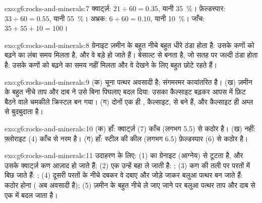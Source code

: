 \begin{solution}{exo:g6:rocks-and-minerals:7}
क्वार्ट्ज़: $21 \div 60 = 0.35$, यानी 35~\%। फ़ेल्डस्पार: $33 \div 60 = 0.55$,
यानी 55~\%। अभ्रक: $6 \div 60 = 0.10$, यानी 10~\%। जाँच:
$35 + 55 + 10 = 100$।
\end{solution}

\begin{solution}{exo:g6:rocks-and-minerals:8}
ग्रेनाइट ज़मीन के बहुत नीचे बहुत धीरे ठंडा होता है: उसके कणों को बढ़ने का लंबा समय
मिलता है, और वे बड़े हो जाते हैं। बेसाल्ट  से बनता है, जो सतह पर जल्दी ठंडा
होता है: उसके कणों को बढ़ने का समय नहीं मिलता और वे देखने के लिए बहुत छोटे रहते हैं।
\end{solution}

\begin{solution}{exo:g6:rocks-and-minerals:9}
(क) चूना पत्थर अवसादी है; संगमरमर कायांतरित है। (ख) ज़मीन के बहुत नीचे
ताप और दाब ने उसे बिना पिघलाए बदल दिया: उसका कैल्साइट बढ़कर आपस में फ़िट बैठने वाले
चमकीले क्रिस्टल बन गया। (ग) दोनों एक ही , कैल्साइट, से बने हैं, और
कैल्साइट ही अम्ल से बुदबुदाता है।
\end{solution}

\begin{solution}{exo:g6:rocks-and-minerals:10}
(क) हाँ: क्वार्ट्ज़ (7) काँच (लगभग 5.5) से कठोर है। (ख) नहीं: फ़्लोराइट (4)
काँच से नरम है। (ग) हाँ: स्टील की कील (लगभग 6.5) फ़ेल्डस्पार (6) से
कठोर है।
\end{solution}

\begin{solution}{exo:g6:rocks-and-minerals:11}
उदाहरण के लिए: (1)  का ग्रेनाइट (आग्नेय)  से टूटता है, और उसके
क्वार्ट्ज़ कण आज़ाद हो जाते हैं; (2) एक  उन्हें बहा ले जाती है:
; (3) कण  की तली पर परतों में बिछ जाते हैं:
; (4) दूसरी परतों के नीचे दबकर वे दबाए और जोड़े जाकर बलुआ पत्थर बन
जाते हैं: कठोर होना ( अब अवसादी है);
(5) ज़मीन के बहुत नीचे ले जाए जाने पर बलुआ पत्थर ताप और दाब से एक  में बदल जाता है।
\end{solution}

